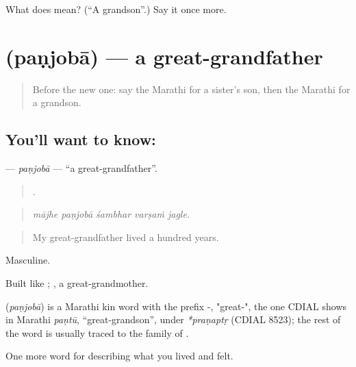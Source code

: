 \begin{tcolorbox}[breakable,colback=teal!4,colframe=teal!35!black,title={Before you move on}]
What does  mean? (\textquotedblleft{}A grandson\textquotedblright{}.) Say it once more.
\end{tcolorbox}
\section[\texorpdfstring{\mr{पणजोबा} (paṇjobā)}{पणजोबा (paṇjobā)}]{ (paṇjobā) — a great-grandfather}

\label{lesson:MR-C495-panjoba}



\begin{quote}
Before the new one: say the Marathi for a sister's son, then the Marathi for a grandson.
\end{quote}

\subsection*{You'll want to know: }
\textbf{} — \emph{paṇjobā} — \textquotedblleft{}a great-grandfather\textquotedblright{}.

\begin{quote}
    .
\end{quote}

\begin{quote}
\emph{mājhe paṇjobā śambhar varṣaṁ jagle.}
\end{quote}

\begin{quote}
My great-grandfather lived a hundred years.
\end{quote}

Masculine.

Built like ; , a great-grandmother.

\begin{cousinweb}
\textbf{} (\emph{paṇjobā}) is a Marathi kin word with the prefix -, "great-", the one CDIAL shows in Marathi \emph{paṇtū}, \textquotedblleft{}great-grandson\textquotedblright{}, under \emph{*praṇaptṛ} (CDIAL 8523); the rest of the word is usually traced to the family of .
\end{cousinweb}

\begin{grammarlens}[title={What you've built}]
One more word for describing what you lived and felt.
\end{grammarlens}

